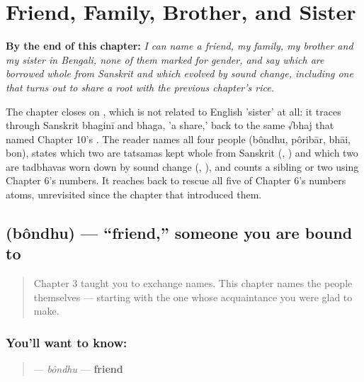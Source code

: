 
\chapter{Friend, Family, Brother, and Sister}
\label{ch:bn-friend-family-brother-sister}

\begin{chapteropening}
\textbf{By the end of this chapter:} \emph{I can name a friend, my family, my brother and my sister in Bengali, none of them marked for gender, and say which are borrowed whole from Sanskrit and which evolved by sound change, including one that turns out to share a root with the previous chapter's rice.}

The chapter closes on , which is not related to English 'sister' at all: it traces through Sanskrit bhaginī and bhaga, 'a share,' back to the same √bhaj that named Chapter 10's . The reader names all four people (bôndhu, pôribār, bhāi, bon), states which two are tatsamas kept whole from Sanskrit (, ) and which two are tadbhavas worn down by sound change (, ), and counts a sibling or two using Chapter 6's numbers. It reaches back to rescue all five of Chapter 6's numbers atoms, unrevisited since the chapter that introduced them.
\end{chapteropening}

\section[bôndhu]{ (bôndhu) — \textquotedblleft{}friend,\textquotedblright{} someone you are bound to}

\label{lesson:BN-C11-bondhu}



\begin{quote}
Chapter 3 taught you to exchange names. This chapter names the people themselves — starting with the one whose acquaintance you were glad to make.
\end{quote}

\subsection*{You'll want to know: }
\begin{quote}
\textbf{} — \emph{bôndhu} — \textbf{friend}
\end{quote}

